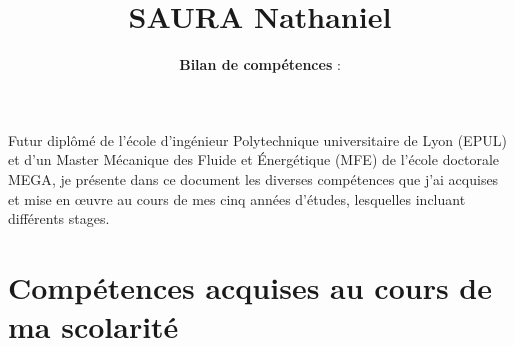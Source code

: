 \documentclass[french]{article}
\newcommand{\brick}{\color{brick}}
\newcommand{\navy}{\color{navy}}
\newcommand{\bk}{\color{black}}
\begin{document}
\title{\navy \textbf{SAURA} \bk \textbf{Nathaniel}}
\author{\textbf{Bilan de compétences} :}

\date{}
\maketitle

\thispagestyle{fancy}

Futur diplômé de l'école d'ingénieur Polytechnique universitaire de Lyon (\textsc{EPUL}) et d'un Master Mécanique des Fluide et Énergétique (\textsc{MFE}) de l'école doctorale \textsc{MEGA}, je présente dans ce document les diverses compétences que j'ai acquises et mise en œuvre au cours de mes cinq années d'études, lesquelles incluant différents stages.\\

 \section*{\brick Compétences acquises au cours de ma scolarité}
\end{document}
